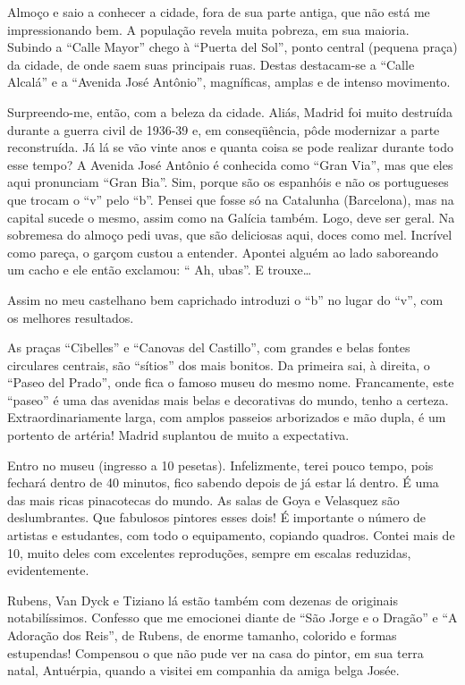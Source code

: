 Almoço e saio a conhecer a cidade, fora de sua parte antiga, que não está me impressionando bem. A população revela muita pobreza, em sua maioria. Subindo a ``Calle Mayor'' chego à ``Puerta del Sol'', ponto central (pequena praça) da cidade, de onde saem suas principais ruas. Destas destacam-se a ``Calle Alcalá'' e a ``Avenida José Antônio'', magníficas, amplas e de intenso movimento.

Surpreendo-me, então, com a beleza da cidade. Aliás, Madrid foi muito destruída durante a guerra civil de 1936-39 e, em conseqüência, pôde modernizar a parte reconstruída. Já lá se vão vinte anos e quanta coisa se pode realizar durante todo esse tempo? A Avenida José Antônio é conhecida como ``Gran Via'', mas que eles aqui pronunciam ``Gran Bia''. Sim, porque são os espanhóis e não os portugueses que trocam o ``v'' pelo ``b''. Pensei que fosse só na Catalunha (Barcelona), mas na capital sucede o mesmo, assim como na Galícia também. Logo, deve ser geral. Na sobremesa do almoço pedi uvas, que são deliciosas aqui, doces como mel. Incrível como pareça, o garçom custou a entender. Apontei alguém ao lado saboreando um cacho e ele então exclamou: `` Ah, ubas''. E trouxe\ldots

Assim no meu castelhano bem caprichado introduzi o ``b'' no lugar do ``v'', com os melhores resultados.

As praças ``Cibelles'' e ``Canovas del Castillo'', com grandes e belas fontes circulares centrais, são ``sítios'' dos mais bonitos. Da primeira sai, à direita, o ``Paseo del Prado'', onde fica o famoso museu do mesmo nome. Francamente, este ``paseo'' é uma das avenidas mais belas e decorativas do mundo, tenho a certeza. Extraordinariamente larga, com amplos passeios arborizados e mão dupla, é um portento de artéria! Madrid suplantou de muito a expectativa.

Entro no museu (ingresso a 10 pesetas). Infelizmente, terei pouco tempo, pois fechará dentro de 40 minutos, fico sabendo depois de já estar lá dentro. É uma das mais ricas pinacotecas do mundo. As salas de Goya e Velasquez são deslumbrantes. Que fabulosos pintores esses dois! É importante o número de artistas e estudantes, com todo o equipamento, copiando quadros. Contei mais de 10, muito deles com excelentes reproduções, sempre em escalas reduzidas, evidentemente.

Rubens, Van Dyck e Tiziano lá estão também com dezenas de originais notabilíssimos. Confesso que me emocionei diante de ``São Jorge e o Dragão'' e ``A Adoração dos Reis'', de Rubens, de enorme tamanho, colorido e formas estupendas! Compensou o que não pude ver na casa do pintor, em sua terra natal, Antuérpia, quando a visitei em companhia da amiga belga Josée.

